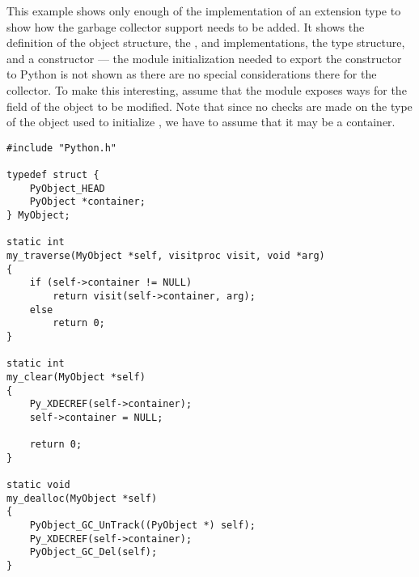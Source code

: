 \documentclass{manual}
\begin{document}
This example shows only enough of the implementation of an extension
type to show how the garbage collector support needs to be added.  It
shows the definition of the object structure, the
,  and 
implementations, the type structure, and a constructor --- the module
initialization needed to export the constructor to Python is not shown
as there are no special considerations there for the collector.  To
make this interesting, assume that the module exposes ways for the
 field of the object to be modified.  Note that
since no checks are made on the type of the object used to initialize
, we have to assume that it may be a container.

\begin{verbatim}
#include "Python.h"

typedef struct {
    PyObject_HEAD
    PyObject *container;
} MyObject;

static int
my_traverse(MyObject *self, visitproc visit, void *arg)
{
    if (self->container != NULL)
        return visit(self->container, arg);
    else
        return 0;
}

static int
my_clear(MyObject *self)
{
    Py_XDECREF(self->container);
    self->container = NULL;

    return 0;
}

static void
my_dealloc(MyObject *self)
{
    PyObject_GC_UnTrack((PyObject *) self);
    Py_XDECREF(self->container);
    PyObject_GC_Del(self);
}
\end{verbatim}
\end{document}
